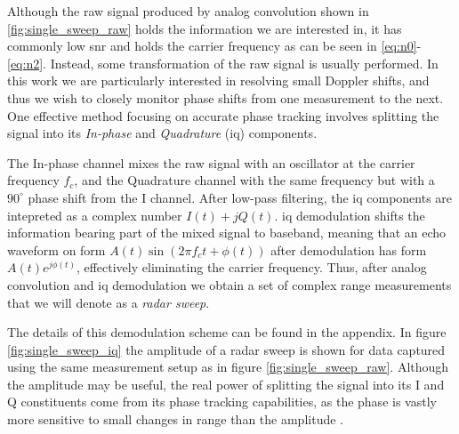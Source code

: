 Although the raw signal produced by analog convolution shown in \ref{fig:single_sweep_raw} holds the information we are interested in, it has commonly low \gls{snr} \citep{richards_2014} and holds the carrier frequency as can be seen in \eqref{eq:n0}-\eqref{eq:n2}. Instead, some transformation of the raw signal is usually performed. In this work we are particularly interested in resolving small Doppler shifts, and thus we wish to closely monitor phase shifts from one measurement to the next. One effective method focusing on accurate phase tracking involves splitting the signal into its \emph{In-phase} and \emph{Quadrature} (\gls{iq}) components. 

The In-phase channel mixes the raw signal with an oscillator at the carrier frequency $f_c$, and the Quadrature channel with the same frequency but with a $90^\circ$ phase shift from the I channel. After low-pass filtering, the \gls{iq} components are intepreted as a complex number $I(t) + jQ(t)$. \gls{iq} demodulation shifts the information bearing part of the mixed signal to baseband, meaning that an echo waveform on form $A(t)\sin(2\pi f_c t + \phi(t))$ after demodulation has form $A(t)e^{j\phi(t)}$, effectively eliminating the carrier frequency. Thus, after analog convolution and \gls{iq} demodulation we obtain a set of complex range measurements that we will denote as a \emph{radar sweep}. 

The details of this demodulation scheme can be found in the appendix. In figure \ref{fig:single_sweep_iq} the amplitude of a radar sweep is shown for data captured using the same measurement setup as in figure \ref{fig:single_sweep_raw}. Although the amplitude may be useful, the real power of splitting the signal into its I and Q constituents come from its phase tracking capabilities, as the phase is vastly more sensitive to small changes in range than the amplitude \citep{lien_gillian_karagozler_amihood_schwesig_olson_raja_poupyrev_2016}.




